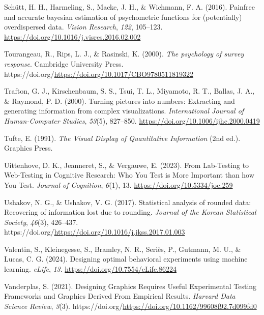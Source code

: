 \documentclass[
  10pt,
  letterpaper,
  DIV=11,
  numbers=noendperiod]{scrartcl}
\newlength{\cslhangindent}
\newenvironment{CSLReferences}[2] %
 {\begin{list}{}{%
  \setlength{\itemindent}{0pt}
  \setlength{\leftmargin}{0pt}
  \setlength{\parsep}{0pt}
  \ifodd #1
   \setlength{\leftmargin}{\cslhangindent}
   \setlength{\itemindent}{-1\cslhangindent}
  \fi
  \setlength{\itemsep}{#2\baselineskip}}}
 {\end{list}}
\begin{document}
\begin{CSLReferences}{1}{0}
Schütt, H. H., Harmeling, S., Macke, J. H., \& Wichmann, F. A. (2016).
Painfree and accurate bayesian estimation of psychometric functions for
(potentially) overdispersed data. \emph{Vision Research}, \emph{122},
105--123. \url{https://doi.org/10.1016/j.visres.2016.02.002}

Tourangeau, R., Rips, L. J., \& Rasinski, K. (2000). \emph{The
psychology of survey response}. Cambridge University Press.
https://doi.org/\url{https://doi.org/10.1017/CBO9780511819322}

Trafton, G. J., Kirschenbaum, S. S., Tsui, T. L., Miyamoto, R. T.,
Ballas, J. A., \& Raymond, P. D. (2000). Turning pictures into numbers:
Extracting and generating information from complex visualizations.
\emph{International Journal of Human-Computer Studies}, \emph{53}(5),
827--850. \url{https://doi.org/10.1006/ijhc.2000.0419}

Tufte, E. (1991). \emph{The {Visual} {Display} of {Quantitative}
{Information}} (2nd ed.). Graphics Press.

Uittenhove, D. K., Jeanneret, S., \& Vergauwe, E. (2023). From
{Lab-Testing} to {Web-Testing} in {Cognitive Research}: {Who You Test}
is {More Important} than how {You Test}. \emph{Journal of Cognition},
\emph{6}(1), 13. \url{https://doi.org/10.5334/joc.259}

Ushakov, N. G., \& Ushakov, V. G. (2017). Statistical analysis of
rounded data: {Recovering} of information lost due to rounding.
\emph{Journal of the Korean Statistical Society}, \emph{46}(3),
426--437.
https://doi.org/\url{https://doi.org/10.1016/j.jkss.2017.01.003}

Valentin, S., Kleinegesse, S., Bramley, N. R., Seriès, P., Gutmann, M.
U., \& Lucas, C. G. (2024). Designing optimal behavioral experiments
using machine learning. \emph{{eLife}}, \emph{13}.
\url{https://doi.org/10.7554/eLife.86224}

Vanderplas, S. (2021). Designing {Graphics} {Requires} {Useful}
{Experimental} {Testing} {Frameworks} and {Graphics} {Derived} {From}
{Empirical} {Results}. \emph{Harvard Data Science Review}, \emph{3}(3).
https://doi.org/\url{https://doi.org/10.1162/99608f92.7d099fd0}


\end{CSLReferences}
\end{document}

